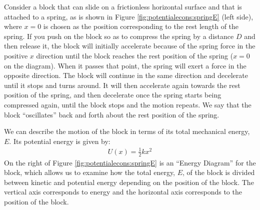 Consider a block that can slide on a frictionless horizontal surface and that is attached to a spring, as is shown in Figure \ref{fig:potentialecons:springE} (left side), where $x=0$ is chosen as the position corresponding to the rest length of the spring. If you push on the block so as to compress the spring by a distance $D$ and then release it, the block will initially accelerate because of the spring force in the positive $x$ direction until the block reaches the rest position of the spring ($x=0$ on the diagram). When it passes that point, the spring will exert a force in the opposite direction. The block will continue in the same direction and decelerate until it stops and turns around. It will then accelerate again towards the rest position of the spring, and then decelerate once the spring starts being compressed again, until the block stops and the motion repeats. We say that the block ``oscillates'' back and forth about the rest position of the spring.

We can describe the motion of the block in terms of its total mechanical energy, $E$. Its potential energy is given by:
\begin{align*}
U(x)=\frac{1}{2}kx^2
\end{align*}
On the right of Figure \ref{fig:potentialecons:springE} is an ``Energy Diagram'' for the block, which allows us to examine how the total energy, $E$, of the block is divided between kinetic and potential energy depending on the position of the block. The vertical axis corresponds to energy and the horizontal axis corresponds to the position of the block. 

